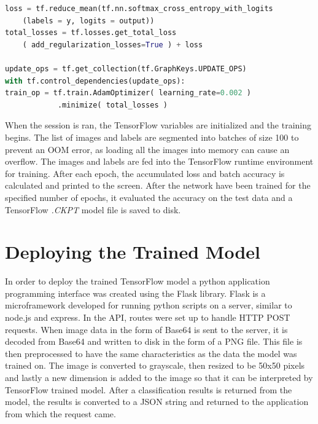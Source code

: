 \begin{lstlisting}[language=python, frame=single]
loss = tf.reduce_mean(tf.nn.softmax_cross_entropy_with_logits
    (labels = y, logits = output))
total_losses = tf.losses.get_total_loss
	( add_regularization_losses=True ) + loss

update_ops = tf.get_collection(tf.GraphKeys.UPDATE_OPS)
with tf.control_dependencies(update_ops):
train_op = tf.train.AdamOptimizer( learning_rate=0.002 )
			.minimize( total_losses )
\end{lstlisting}


When the session is ran, the TensorFlow variables are initialized and the training begins. 
The list of images and labels are segmented into batches of size 100 to prevent an OOM error, as loading all the images into memory can cause an overflow. The images and labels are fed into the TensorFlow runtime environment for training. After each epoch, the accumulated loss and batch accuracy is calculated and printed to the screen.
After the network have been trained for the specified number of epochs, it evaluated the accuracy on the test data and a TensorFlow \textit{.CKPT} model file is saved to disk.


\section{Deploying the Trained Model}
In order to deploy the trained TensorFlow model a python application programming interface was created using the Flask library. Flask is a microframework developed for running python scripts on a server, similar to node.js and express. In the API, routes were set up to handle HTTP POST requests. When image data in the form of Base64 is sent to the server, it is decoded from Base64 and written to disk in the form of a PNG file. This file is then preprocessed to have the same characteristics as the data the model was trained on. The image is converted to grayscale, then resized to be 50x50 pixels and lastly a new dimension is added to the image so that it can be interpreted by TensorFlow trained model. After a classification results is returned from the model, the results is converted to a JSON string and returned to the application from which the request came.

